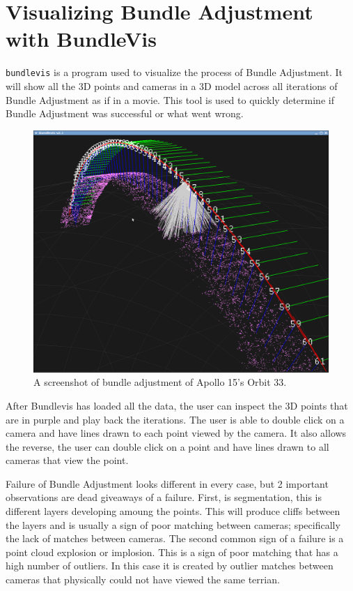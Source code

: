 \section{Visualizing Bundle Adjustment with BundleVis}

\texttt{bundlevis} is a program used to visualize the process of
Bundle Adjustment. It will show all the 3D points and cameras in a 3D
model across all iterations of Bundle Adjustment as if in a
movie. This tool is used to quickly determine if Bundle Adjustment was
successful or what went wrong.

\begin{figure}[htp]
  \begin{center}
  \includegraphics[width=5in]{images/bundlevis_apollo.png}
  \end{center}
  \caption{ A screenshot of bundle adjustment of Apollo 15's Orbit 33. }
  \label{fig:bundlevis}
\end{figure}

After Bundlevis has loaded all the data, the user can inspect the 3D
points that are in purple and play back the iterations. The user is
able to double click on a camera and have lines drawn to each point
viewed by the camera. It also allows the reverse, the user can double
click on a point and have lines drawn to all cameras that view the
point.

Failure of Bundle Adjustment looks different in every case,
but 2 important observations are dead giveaways of a failure. First,
is segmentation, this is different layers developing amoung the
points. This will produce cliffs between the layers and is usually a
sign of poor matching between cameras; specifically the lack of
matches between cameras. The second common sign of a failure is a
point cloud explosion or implosion. This is a sign of poor matching
that has a high number of outliers. In this case it is created
by outlier matches between cameras that physically could not have viewed the
same terrian.


